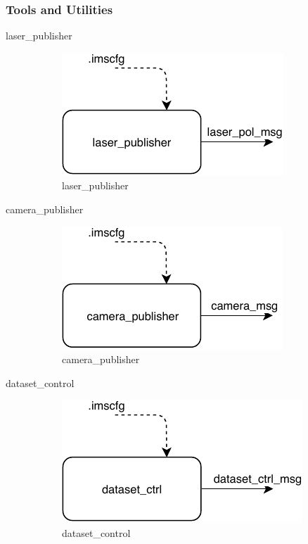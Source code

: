 \subsubsection{Tools and Utilities}
\begin{description}

\item[laser\_publisher] \hfill
\begin{figure}[ht!]
\centering
\includegraphics[scale=1]{fig/3/laser_publisher.pdf}
\caption{laser\_publisher}
\label{laser_publisher}
\end{figure}

\item[camera\_publisher] \hfill
\begin{figure}[ht!]
\centering
\includegraphics[scale=1]{fig/3/camera_publisher.pdf}
\caption{camera\_publisher}
\label{camera_publisher}
\end{figure}

\item[dataset\_control] \hfill
\begin{figure}[ht!]
\centering
\includegraphics[scale=1]{fig/3/dataset_ctrl.pdf}
\caption{dataset\_control}
\label{dataset_control}
\end{figure}


\end{description}
